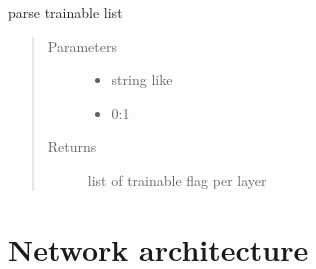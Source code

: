 \documentclass[letterpaper,10pt,english]{sphinxmanual}
\begin{document}
\begin{fulllineitems}
\label{\detokenize{neuralnet/parser_callable:parser_callable.get_network_trainable}}
parse trainable list
\begin{quote}\begin{description}
\item[{Parameters}] \leavevmode\begin{itemize}
\item {} 
 \textendash{} string like

\item {} 
 \textendash{} 0:1

\end{itemize}

\item[{Returns}] \leavevmode
list of trainable flag per layer

\end{description}\end{quote}

\end{fulllineitems}



\chapter{Network architecture}
\label{\detokenize{neuralnet/networks:module-networks}}\label{\detokenize{neuralnet/networks:network-architecture}}\label{\detokenize{neuralnet/networks::doc}}
\end{document}
